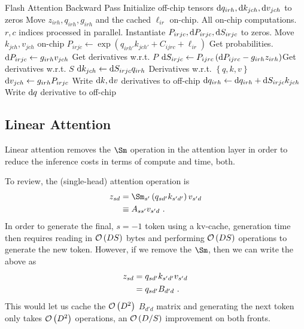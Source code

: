 \documentclass[11pt]{article}
\begin{document}
\begin{algo}{Flash Attention Backward Pass}
\State Initialize off-chip tensors $ {\rm d} q _{ irh }, {\rm d} k _{ jch }, {\rm d} v _{ jch }  $ to zeros
\State Move  $ z _{ irh }, q _{ irh }, g _{ irh }$ and the cached $ \ell _{ ir } $ on-chip.
 \Comment All on-chip computations. $ r, c $ indices processed in parallel.
    \State Instantiate $ P _{ irjc },{\rm d} P _{ irjc } ,{\rm d} S _{ irjc } $  to zeros.
    \State Move  $ k_{ jch },v _{ jch }$ on-chip
    \State $ P _{ irjc } \gets   \exp \left (q _{ irh' } k _{ jch' } + C _{ ijrc } + \ell _{ ir } \right )$ \Comment Get probabilities.
    \State $ {\rm d} P _{ irjc } \gets   g _{ irh} v _{ jch }$ \Comment Get derivatives w.r.t. $ P $
    \State $ {\rm d} S _{ irjc } \gets  P _{ ijrc }\left ( {\rm d} P _{ ijrc } - g _{ irh } z _{ irh }  \right ) $\Comment Get derivatives w.r.t. $ S $
    \State $ {\rm d} k _{ jch } \gets  {\rm d} S _{ irjc }  q _{ irh }$ \Comment Derivatives w.r.t. $ \left \{q,  k, v \right \} $
    \State $ {\rm d} v _{ jch } \gets  g _{ irh }P _{ irjc }$
    \State Write $ {\rm d} k, {\rm d} v $  derivatives to off-chip
    \State $ {\rm d} q _{ irh } \gets {\rm d} q _{ irh }+ {\rm d} S _{ irjc }  k _{ jch } $
\EndFor
\State Write $ {\rm d} q $  derivative to off-chip
\EndFor
\label{algo_fa_bwd_advanced}
\end{algo}


\subsection{Linear Attention \label{subsec_linear_attn}}

Linear attention \cite{katharopoulos2020transformersrnnsfastautoregressive} removes the $ \Sm $ operation in the attention layer in order to reduce the inference costs in terms of
compute and time, both.

To review, the (single-head) attention operation is
\begin{align}
    z _{ sd } &= \Sm_{ s' }\left ( q _{ sd' } k _{ s'd' }  \right ) v _{ s'd }\nn
     &\equiv A _{ s s' } v _{ s'd } \ .
\end{align}
In order to generate the final, $ s=-1 $ token using a kv-cache, generation time then requires
reading in $ \mathcal{O} \left( DS \right)  $ bytes and performing $ \mathcal{O} \left( DS \right)  $ operations
to generate the new token. However, if we remove the $ \Sm $, then we can write the above as
\begin{align}
    z _{ sd } &=  q _{ sd' } k _{ s'd' }  v _{ s'd }\nonumber\\
         &= q _{ sd' }B _{d' d }  \ .
\end{align}
This would let us cache the $ \mathcal{O} \left( D ^{ 2 } \right)  $ $ B _{ d'd } $ matrix and generating
the next token only takes $ \mathcal{O} \left( D ^{ 2 } \right)  $ operations, an $ \mathcal{O} \left( D/S
\right) $ improvement on both fronts.
\end{document}
